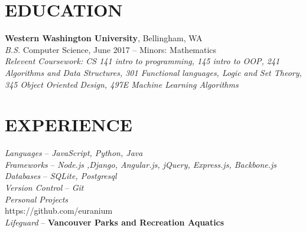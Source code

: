 \documentclass[line,margin]{res}
\begin{document}
\address{360.931.3237 $|$ rainierharvey@gmail.com $|$ https://rainierharvey.me $|$ github.com/euranium}

\begin{resume}

\section{EDUCATION}
	{\bf Western Washington University}, Bellingham, WA \\
	{\sl B.S.} Computer Science, {\small June 2017} -- Minors: Mathematics \\
	{\sl Relevent Coursework: CS 141 {\small intro to programming}, 145 {\small intro to OOP}, 241 {\small Algorithms and Data Structures},
	301 {\small Functional languages, Logic and Set Theory}, 345 {\small Object Oriented Design}, 497E {\small Machine Learning Algorithms}}

\section{EXPERIENCE}

	{\sl Languages} -- {\sl JavaScript, Python, Java}\\
	{\sl Frameworks} -- {\sl Node.js ,Django, Angular.js, jQuery, Express.js, Backbone.js} \\
	{\sl Databases} -- {\sl SQLite, Postgresql} \\
	{\sl Version Control} -- {\sl Git}\\
	{\sl Personal Projects}\\
	{\footnotesize https://github.com/euranium}\\
	{\sl Lifeguard} -- {\bf Vancouver Parks and Recreation Aquatics} \\


\end{resume}
\end{document}
